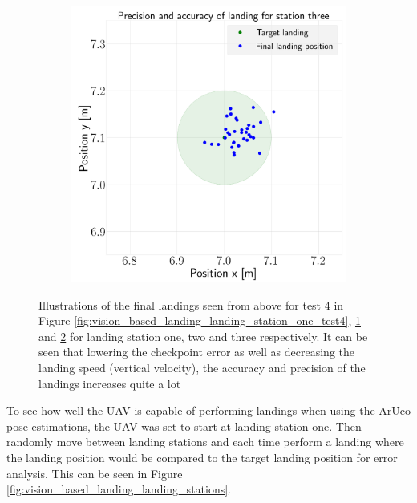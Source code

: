 \documentclass[../Head/report.tex]{subfiles}
\begin{document}
\begin{figure}[H]
\begin{subfigure}[t]{.30\textwidth}
        \caption{}
        \label{fig:vision_based_landing_landing_station_two_test4}
    \end{subfigure}
     \hspace{0.2em}
    \begin{subfigure}[t]{.30\textwidth}
        \centering
        \includegraphics[width=\textwidth]{../Figures/landing_test/test4_speed_0.1_error_0.05/landing_for_station_three.png}
        \caption{}
        \label{fig:vision_based_landing_landing_station_three_test4}
    \end{subfigure}
    \caption{Illustrations of the final landings seen from above for test 4 in Figure \ref{fig:vision_based_landing_landing_station_one_test4}, \ref{fig:vision_based_landing_landing_station_two_test4} and \ref{fig:vision_based_landing_landing_station_three_test4} for landing station one, two and three respectively. It can be seen that lowering the checkpoint error as well as decreasing the landing speed (vertical velocity), the accuracy and precision of the landings increases quite a lot}
    \label{fig:vision_based_landing_test4}
\end{figure}

To see how well the UAV is capable of performing landings when using the ArUco pose estimations, the UAV was set to start at landing station one. Then randomly move between landing stations and each time perform a landing where the landing position would be compared to the target landing position for error analysis. This can be seen in Figure \ref{fig:vision_based_landing_landing_stations}.  
\end{document}
